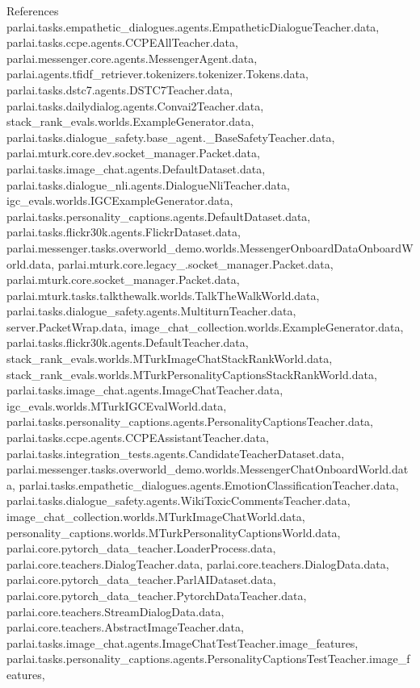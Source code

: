 References parlai.\+tasks.\+empathetic\+\_\+dialogues.\+agents.\+Empathetic\+Dialogue\+Teacher.\+data, parlai.\+tasks.\+ccpe.\+agents.\+C\+C\+P\+E\+All\+Teacher.\+data, parlai.\+messenger.\+core.\+agents.\+Messenger\+Agent.\+data, parlai.\+agents.\+tfidf\+\_\+retriever.\+tokenizers.\+tokenizer.\+Tokens.\+data, parlai.\+tasks.\+dstc7.\+agents.\+D\+S\+T\+C7\+Teacher.\+data, parlai.\+tasks.\+dailydialog.\+agents.\+Convai2\+Teacher.\+data, stack\+\_\+rank\+\_\+evals.\+worlds.\+Example\+Generator.\+data, parlai.\+tasks.\+dialogue\+\_\+safety.\+base\+\_\+agent.\+\_\+\+Base\+Safety\+Teacher.\+data, parlai.\+mturk.\+core.\+dev.\+socket\+\_\+manager.\+Packet.\+data, parlai.\+tasks.\+image\+\_\+chat.\+agents.\+Default\+Dataset.\+data, parlai.\+tasks.\+dialogue\+\_\+nli.\+agents.\+Dialogue\+Nli\+Teacher.\+data, igc\+\_\+evals.\+worlds.\+I\+G\+C\+Example\+Generator.\+data, parlai.\+tasks.\+personality\+\_\+captions.\+agents.\+Default\+Dataset.\+data, parlai.\+tasks.\+flickr30k.\+agents.\+Flickr\+Dataset.\+data, parlai.\+messenger.\+tasks.\+overworld\+\_\+demo.\+worlds.\+Messenger\+Onboard\+Data\+Onboard\+World.\+data, parlai.\+mturk.\+core.\+legacy\+\_.\+socket\+\_\+manager.\+Packet.\+data, parlai.\+mturk.\+core.\+socket\+\_\+manager.\+Packet.\+data, parlai.\+mturk.\+tasks.\+talkthewalk.\+worlds.\+Talk\+The\+Walk\+World.\+data, parlai.\+tasks.\+dialogue\+\_\+safety.\+agents.\+Multiturn\+Teacher.\+data, server.\+Packet\+Wrap.\+data, image\+\_\+chat\+\_\+collection.\+worlds.\+Example\+Generator.\+data, parlai.\+tasks.\+flickr30k.\+agents.\+Default\+Teacher.\+data, stack\+\_\+rank\+\_\+evals.\+worlds.\+M\+Turk\+Image\+Chat\+Stack\+Rank\+World.\+data, stack\+\_\+rank\+\_\+evals.\+worlds.\+M\+Turk\+Personality\+Captions\+Stack\+Rank\+World.\+data, parlai.\+tasks.\+image\+\_\+chat.\+agents.\+Image\+Chat\+Teacher.\+data, igc\+\_\+evals.\+worlds.\+M\+Turk\+I\+G\+C\+Eval\+World.\+data, parlai.\+tasks.\+personality\+\_\+captions.\+agents.\+Personality\+Captions\+Teacher.\+data, parlai.\+tasks.\+ccpe.\+agents.\+C\+C\+P\+E\+Assistant\+Teacher.\+data, parlai.\+tasks.\+integration\+\_\+tests.\+agents.\+Candidate\+Teacher\+Dataset.\+data, parlai.\+messenger.\+tasks.\+overworld\+\_\+demo.\+worlds.\+Messenger\+Chat\+Onboard\+World.\+data, parlai.\+tasks.\+empathetic\+\_\+dialogues.\+agents.\+Emotion\+Classification\+Teacher.\+data, parlai.\+tasks.\+dialogue\+\_\+safety.\+agents.\+Wiki\+Toxic\+Comments\+Teacher.\+data, image\+\_\+chat\+\_\+collection.\+worlds.\+M\+Turk\+Image\+Chat\+World.\+data, personality\+\_\+captions.\+worlds.\+M\+Turk\+Personality\+Captions\+World.\+data, parlai.\+core.\+pytorch\+\_\+data\+\_\+teacher.\+Loader\+Process.\+data, parlai.\+core.\+teachers.\+Dialog\+Teacher.\+data, parlai.\+core.\+teachers.\+Dialog\+Data.\+data, parlai.\+core.\+pytorch\+\_\+data\+\_\+teacher.\+Parl\+A\+I\+Dataset.\+data, parlai.\+core.\+pytorch\+\_\+data\+\_\+teacher.\+Pytorch\+Data\+Teacher.\+data, parlai.\+core.\+teachers.\+Stream\+Dialog\+Data.\+data, parlai.\+core.\+teachers.\+Abstract\+Image\+Teacher.\+data, parlai.\+tasks.\+image\+\_\+chat.\+agents.\+Image\+Chat\+Test\+Teacher.\+image\+\_\+features, parlai.\+tasks.\+personality\+\_\+captions.\+agents.\+Personality\+Captions\+Test\+Teacher.\+image\+\_\+features, 